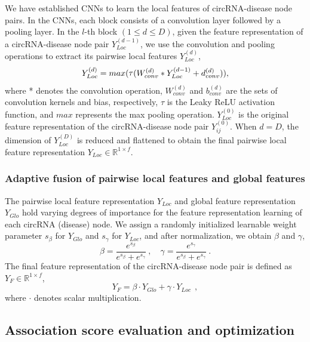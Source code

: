\documentclass[journal,twoside,web]{ieeecolor}
\begin{document}
We have established CNNs to learn the local features of circRNA-disease node pairs. In the CNNs, each block consists of a convolution layer followed by a pooling layer. In the $l$-th block $(1 \leqslant d \leqslant D)$, given the feature representation of a circRNA-disease node pair ${Y}_{Loc}^{(d - 1)}$, we use the convolution and pooling operations to extract its pairwise local features ${Y}_{Loc}^{(d)}$,
\begin{equation}
{Y}_{Loc}^{(d)} = max(\mathop{\rm{\tau}}({W_{conv}^{(d)}}  * {Y}_{Loc}^{(d - 1)} + {d_{conv}^{(d)}})),
\end{equation}
where * denotes the convolution operation, $W_{conv}^{(d)}$ and $b_{conv}^{(d)}$ are the sets of convolution kernels and bias, respectively, $\tau$ is the Leaky ReLU activation function, and $max$ represents the max pooling operation. $Y_{Loc}^{(0)}$ is the original feature representation of the circRNA-disease node pair $Y_{ij}^{(0)}$. When $d = D$, the dimension of $Y_{Loc}^{(D)}$ is reduced and flattened to obtain the final pairwise local feature representation $Y_{Loc} \in \mathbb{R}^{1\times f}$.

\subsubsection{Adaptive fusion of pairwise local features and global features}
The pairwise local feature representation ${Y_{Loc}}$ and global feature representation ${Y_{Glo}}$ hold varying degrees of importance for the feature representation learning of each circRNA (disease) node. We assign a randomly initialized learnable weight parameter $s_{\beta}$ for ${Y_{Glo}}$ and $s_{\gamma}$ for ${Y_{Loc}}$, and after normalization, we obtain $\beta$ and $\gamma$,
\begin{equation}
    \beta = \frac{e^{s_{\beta}}}{e^{s_{\beta}} + e^{s_{\gamma}}}\ , \quad \gamma = \frac{e^{s_{\gamma}}}{e^{s_{\beta}} + e^{s_{\gamma}}}\ .
\end{equation}
The final feature representation of the circRNA-disease node pair is defined as ${Y}_{F} \in \mathbb{R}^{1\times f}$,
\begin{equation}
    {Y}_{F} = \beta \cdot {Y_{Glo}} + \gamma \cdot {Y_{Loc}}\ \ ,
\end{equation}
where $\cdot$ denotes scalar multiplication.

\subsection{Association score evaluation and optimization}
\end{document}
